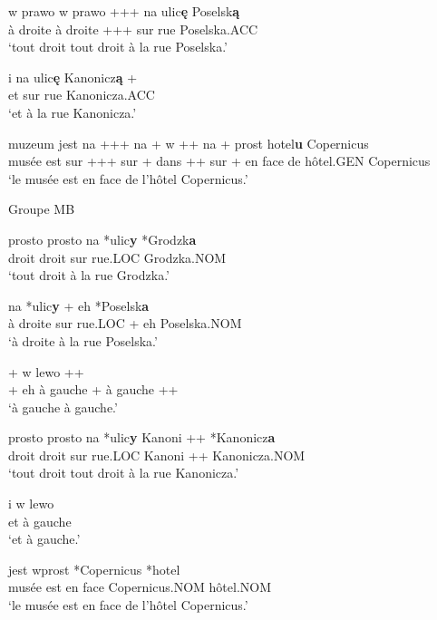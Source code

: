 \documentclass[output=paper]{langscibook}
\begin{document}
\begin{otherlanguage}{french}
\ex
\gll w prawo w prawo +++   na   ulic\textbf{ę} Poselsk\textbf{ą} \\
 à droite à droite +++   sur   rue Poselska.ACC\\
\glt     ‘tout droit tout droit à la rue Poselska.’

\ex
\gll i   na   ulic\textbf{ę} Kanonicz\textbf{ą} \++ \\
    et   sur   rue   Kanonicza.ACC\\
\glt     ‘et à la rue Kanonicza.’

\ex
\gll muzeum jest na +++    na + w ++  {na + prost} {hotel\textbf{u}} {Copernicus} \\
 musée est     sur +++ sur + dans ++ {sur + en face de} {hôtel.GEN} {Copernicus}\\
\glt ‘le musée est en face de l’hôtel Copernicus.’
\z
\z

\ea%
    \label{ex:watorek:8}
           Groupe MB

  \ea
  \gll prosto   prosto  {na} {*ulic\textbf{y}} *Grodzk\textbf{a}\\
 droit   droit     {sur} {rue.LOC} Grodzka.NOM\\
\glt     ‘tout droit à la rue Grodzka.’

 \ex
{} {na} {*ulic\textbf{y}} {+} {eh *Poselsk\textbf{a}}\\
 {à droite} {sur} {rue.LOC} {+} {eh Poselska.NOM}\\
\glt     ‘à droite à la rue Poselska.’

\ex
{} {+ w lewo} ++\\
 {+ eh à gauche} {+ à gauche} ++\\
\glt     ‘à gauche à gauche.’

\ex
\gll prosto prosto na {*ulic\textbf{y}} {Kanoni ++} {*Kanonicz\textbf{a}}\\
 droit   droit   sur  {rue.LOC}   {Kanoni ++}       {Kanonicza.NOM}\\
\glt    ‘tout droit tout droit à la rue Kanonicza.’

\ex
\gll i w {lewo} \\
 et à gauche\\
\glt     ‘et à gauche.’

\ex
{}   {jest}   {wprost}   *Copernicus *hotel \\
 {musée}   {est}   {en face}   Copernicus.NOM hôtel.NOM\\
\glt     ‘le musée est en face de l’hôtel Copernicus.’
\z
\z


\end{otherlanguage}
\end{document}
